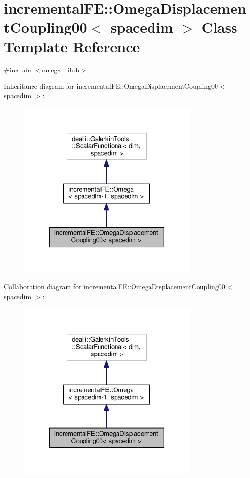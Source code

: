\hypertarget{classincremental_f_e_1_1_omega_displacement_coupling00}{}\section{incremental\+FE\+:\+:Omega\+Displacement\+Coupling00$<$ spacedim $>$ Class Template Reference}
\label{classincremental_f_e_1_1_omega_displacement_coupling00}


{\ttfamily \#include $<$omega\+\_\+lib.\+h$>$}



Inheritance diagram for incremental\+FE\+:\+:Omega\+Displacement\+Coupling00$<$ spacedim $>$\+:\nopagebreak
\begin{figure}[H]
\begin{center}
\leavevmode
\includegraphics[width=257pt]{classincremental_f_e_1_1_omega_displacement_coupling00__inherit__graph}
\end{center}
\end{figure}


Collaboration diagram for incremental\+FE\+:\+:Omega\+Displacement\+Coupling00$<$ spacedim $>$\+:\nopagebreak
\begin{figure}[H]
\begin{center}
\leavevmode
\includegraphics[width=257pt]{classincremental_f_e_1_1_omega_displacement_coupling00__coll__graph}
\end{center}
\end{figure}
